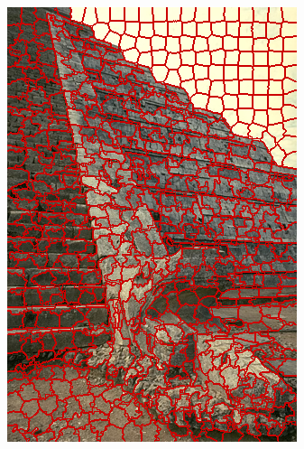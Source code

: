 \begin{figure}
{		\includegraphics[scale=\scalefivebsdtest]{pictures/bsd-test-6-orislic}
	}
	\subfigure{
}
\end{figure}
